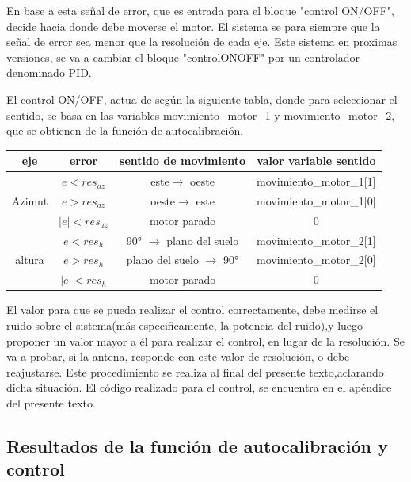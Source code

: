  En base a esta señal de error, que es entrada para el bloque "control ON/OFF", decide hacia donde debe moverse el motor. El sistema se para siempre que la señal de error sea menor que la resolución de cada eje. Este sistema en proximas versiones, se va a cambiar el bloque "controlONOFF" por un controlador denominado PID. 

 El control ON/OFF, actua de según la siguiente tabla, donde para seleccionar el sentido, se basa en las variables movimiento\_motor\_1 y movimiento\_motor\_2, que se obtienen de la función de autocalibración. 
 
 \begin{table}[ht]
 	\centering 
 	\begin{tabular}{|c|c|c|c|}
 		\hline 
 		eje & error & sentido de movimiento & valor variable sentido \\ 
 		\hline	 
 		\multirow{3}{*}{Azimut}& $e<res_{az}$ & este$\rightarrow$ oeste  &movimiento\_motor\_1[1] \\ \cline{2-4}
 		& $e>res_{az}$& oeste$\rightarrow$ este& movimiento\_motor\_1[0] \\ \cline{2-4}
 		& $|e|<res_{az}$& motor parado & 0\\ \cline{2-4}
 		\hline   
 		\multirow{3}{*}{altura}& $e<res_h $ &90° $\rightarrow$ plano del suelo& movimiento\_motor\_2[1] \\ \cline{2-4}
 		& $e>res_h$ &plano del suelo $\rightarrow$ 90° & movimiento\_motor\_2[0] \\ \cline{2-4}
 		& $|e|<res_h$& motor parado& 0\\ 
 		\hline
 		  			
  	\end{tabular}
 \end{table}  
 
 El valor para que se pueda realizar el control correctamente, debe medirse el ruido sobre el sistema(más especificamente, la potencia del ruido),y luego proponer un valor mayor a él para realizar el control, en lugar de la resolución. Se va a probar, si la antena, responde con este valor de resolución, o debe reajustarse. Este procedimiento se realiza al final del presente texto,aclarando dicha situación. El código realizado para el control, se encuentra en el apéndice del presente texto. 

\subsection{Resultados de la función de autocalibración y control}

